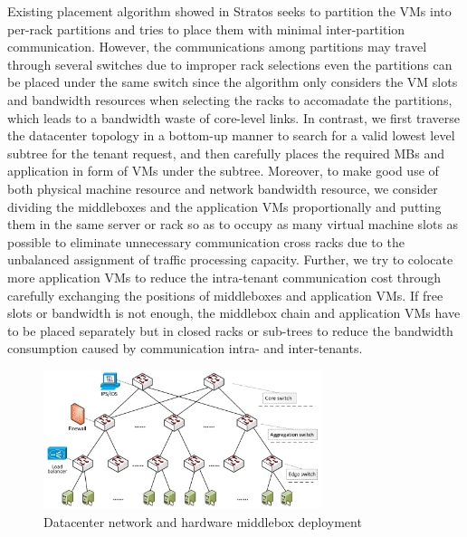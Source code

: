 \documentclass[review]{elsarticle}
\begin{document}
Existing placement algorithm showed in Stratos \cite{stratos12} seeks to partition the VMs into per-rack partitions and tries to place them with minimal inter-partition communication. However, the communications among partitions may travel through several switches due to improper rack selections even the partitions can be placed under the same switch since the algorithm only considers the VM slots and bandwidth resources when selecting the racks to accomadate the partitions, which leads to a bandwidth waste of core-level links.  
In contrast, %
we first traverse the datacenter topology in a bottom-up manner to search for a valid lowest level subtree for the tenant request, and then carefully places the required MBs and application in form of VMs under the subtree. 
Moreover, to make good use of both physical machine resource and network bandwidth resource, we consider dividing the middleboxes and the application VMs proportionally and putting them in the same server or rack so as to occupy as many virtual machine slots as possible to eliminate unnecessary communication cross racks due to the unbalanced assignment of traffic processing capacity. Further, we try to colocate more application VMs to reduce the intra-tenant communication cost through carefully exchanging the positions of middleboxes and application VMs. If free slots or bandwidth is not enough, the middlebox chain and application VMs have to be placed separately but in closed racks or sub-trees to reduce the bandwidth consumption caused by communication intra- and inter-tenants. 


\begin{figure}
	\centering
		\includegraphics[width=3.2in]{fig/topology.pdf}
	\caption{Datacenter network and hardware middlebox deployment}
	\label{fig:topo}
\end{figure}
\end{document}
